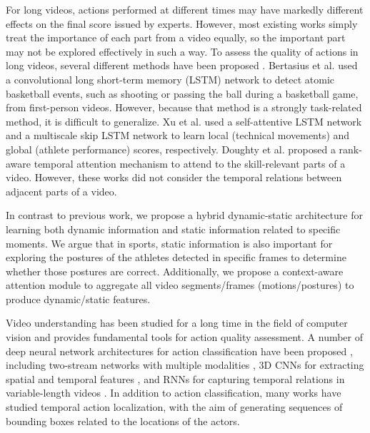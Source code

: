 \documentclass[sigconf]{acmart}
\begin{document}
For long videos, actions performed at different times may have markedly different effects on the final score issued by experts. However, most existing works \cite{pirsiavash2014assessing, parmar2017learning,pan2019action} simply treat the importance of each part from a video equally, so the important part may not be explored effectively in such a way. To assess the quality of actions in long videos, several different methods have been proposed \cite{bertasius2017baller,doughty2019pros,xu2019learning}. Bertasius et al. \cite{bertasius2017baller} used a convolutional long short-term memory (LSTM) network to detect atomic basketball events, such as shooting or passing the ball during a basketball game, from first-person videos. However, because that method is a strongly task-related method, it is difficult to generalize. Xu et al. \cite{xu2019learning} used a self-attentive LSTM network and a multiscale skip LSTM network to learn local (technical movements) and global (athlete performance) scores, respectively. Doughty et al. \cite{doughty2019pros} proposed a rank-aware temporal attention mechanism to attend to the skill-relevant parts of a video. However, these works did not consider the temporal relations between adjacent parts of a video.

In contrast to previous work, we propose a hybrid dynamic-static architecture for learning both dynamic information and static information related to specific moments. We argue that in sports, static information is also important for exploring the postures of the athletes detected in specific frames to determine whether those postures are correct. Additionally, we propose a context-aware attention module to aggregate all video segments/frames (motions/postures) to produce dynamic/static features.

\vspace{5pt}

Video understanding has been studied for a long time in the field of computer vision and provides fundamental tools for action quality assessment. A number of deep neural network architectures for action classification have been proposed \cite{simonyan2014two, wang2016temporal, tran2015learning, carreira2017quo, yue2015beyond, yang2018making}, including two-stream networks with multiple modalities \cite{simonyan2014two,wang2016temporal}, 3D CNNs for extracting spatial and temporal features \cite{tran2015learning, carreira2017quo}, and RNNs for capturing temporal relations in variable-length videos \cite{yue2015beyond,yang2018making}. In addition to action classification, many works \cite{saha2016deep,zolfaghari2017chained,alwando2018cnn,peng2016multi} have studied temporal action localization, with the aim of generating sequences of bounding boxes related to the locations of the actors.
\end{document}

